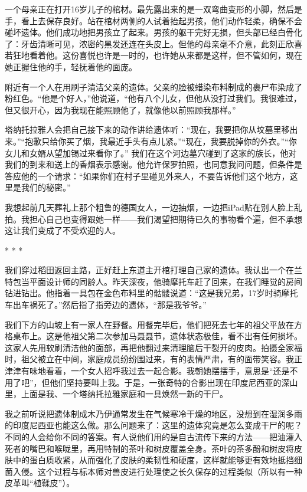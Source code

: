 \documentclass[12pt,oneside]{book}
\begin{document}
\begin{bookref}[frametitle={\cite{好好告别}}]
一个母亲正在打开16岁儿子的棺材。最先露出来的是一双弯曲变形的小脚，然后是手，看上去保存良好。站在棺材两侧的人试着抬起男孩，他们动作轻柔，确保不会碰坏遗体。他们成功地把男孩立了起来。男孩的躯干完好无损，但头部已经白骨化了：牙齿清晰可见，浓密的黑发还连在头皮上。但他的母亲毫不介意，此刻正欣喜若狂地看着他。这份喜悦也许是一时的，也许她从来都是这样，但不管如何，现在她正握住他的手，轻抚着他的面庞。

附近有一个人在用刷子清洁父亲的遗体。父亲的脸被蜡染布料制成的裹尸布染成了粉红色。“他是个好人，”他说道，“他有八个儿女，但他从没打过我们。我很难过，但又很开心，因为我现在能照顾他了，就像他以前照顾我那样。”

塔纳托拉雅人会把自己接下来的动作讲给遗体听：“现在，我要把你从坟墓里移出来。”“抱歉只给你买了烟，我最近手头有点儿紧。”“现在，我要脱掉你的外衣。”“你女儿和女婿从望加锡过来看你了。”
我们在这个河边墓穴碰到了这家的族长，他对我们的到来和送上的香烟表示感谢。他允许保罗拍照，也同意我问问题，但条件是答应他的一个请求：“如果你们在村子里碰见外来人，不要告诉他们这个地方，这里是我们的秘密。”

我想起前几天葬礼上那个粗鲁的德国女人，一边抽烟，一边把iPad贴在别人脸上乱拍。我担心自己也变得跟她一样——我们渴望把期待已久的事物看个遍，但不承想这让我们变成了不受欢迎的人。

\begin{center}
* * *
\end{center}

我们穿过稻田返回主路，正好赶上东道主开棺打理自己家的遗体。我认出一个在兰特包当平面设计师的同龄人。昨天深夜，他骑摩托车赶了回来，在我们睡觉的房间钻进钻出。他指着一具包在金色布料里的骷髅说道：“这是我兄弟，17岁时骑摩托车出车祸死了。”然后指了指旁边的遗体，“那是我爷爷。”

我们下方的山坡上有一家人在野餐。用餐完毕后，他们把死去七年的祖父平放在方格桌布上。这是他祖父第二次参加马聂聂节，遗体状态极佳，看不出有任何损坏。这家人先用软刷清洁他的面部，再把他翻过来清理脑后干裂开的皮肉。拍摄全家福时，祖父被立在中间，家庭成员纷纷围过来，有的表情严肃，有的面带笑容。我正津津有味地看着，一个女人招呼我过去一起合影。我朝她摆摆手，意思是“还是不用了吧”，但他们坚持要叫上我。于是，一张奇特的合影出现在印度尼西亚的深山里，上面是我、一个塔纳托拉雅家庭和一具焕然一新的干尸。

我之前听说把遗体制成木乃伊通常发生在气候寒冷干燥的地区，没想到在湿润多雨的印度尼西亚也能这么做。那么问题来了：这里的遗体究竟是怎么变成干尸的呢？不同的人会给你不同的答案。有人说他们用的是自古流传下来的方法——把油灌入死者的嘴巴和喉咙里，再用特制的茶叶和树皮覆盖全身。茶叶的茶多酚和树皮将皮肤中的蛋白质收紧，从而强化了皮肤的柔韧性和硬度，这样就能够更有效地抵挡细菌入侵。这个过程与标本师对兽皮进行处理使之长久保存的过程类似（所以有一种皮革叫“植鞣皮”）。


\end{bookref}
\end{document}
